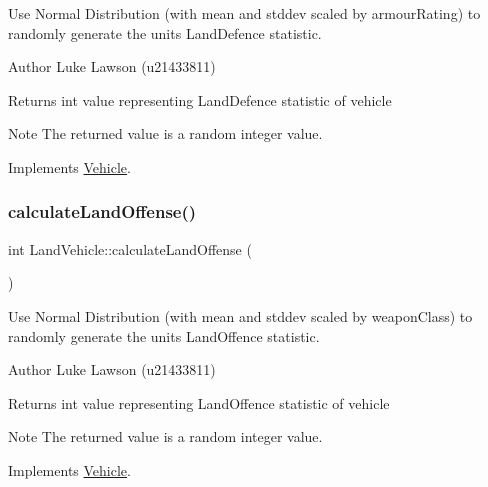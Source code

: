 Use Normal Distribution (with mean and stddev scaled by armour\+Rating) to randomly generate the unit\textquotesingle{}s Land\+Defence statistic. 

\begin{DoxyAuthor}{Author}
Luke Lawson (u21433811) 
\end{DoxyAuthor}
\begin{DoxyReturn}{Returns}
int value representing Land\+Defence statistic of vehicle 
\end{DoxyReturn}
\begin{DoxyNote}{Note}
The returned value is a random integer value. 
\end{DoxyNote}


Implements \mbox{\hyperlink{class_vehicle_a155724a3ab7689c7bafb970ad47ac0df}{Vehicle}}.

\mbox{\label{class_land_vehicle_ae8604789808fddcd4e58122c11ee18cd}} 
\subsubsection{\texorpdfstring{calculateLandOffense()}{calculateLandOffense()}}
{\footnotesize\ttfamily int Land\+Vehicle\+::calculate\+Land\+Offense (\begin{DoxyParamCaption}{ }\end{DoxyParamCaption})\hspace{0.3cm}{\ttfamily [virtual]}}



Use Normal Distribution (with mean and stddev scaled by weapon\+Class) to randomly generate the unit\textquotesingle{}s Land\+Offence statistic. 

\begin{DoxyAuthor}{Author}
Luke Lawson (u21433811) 
\end{DoxyAuthor}
\begin{DoxyReturn}{Returns}
int value representing Land\+Offence statistic of vehicle 
\end{DoxyReturn}
\begin{DoxyNote}{Note}
The returned value is a random integer value. 
\end{DoxyNote}


Implements \mbox{\hyperlink{class_vehicle_a6b272c05209a8907ebe6229e66317f4a}{Vehicle}}.

